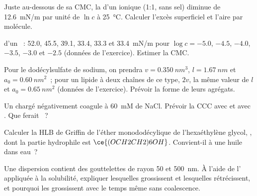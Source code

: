\begin{exercise}[$\star\star$]\label{exo:b3:colloids:5}
Juste au-dessous de sa CMC, la  d'un 
ionique (1:1, sans sel) diminue de \qty{12.6}{mN/m} par unité de $\ln c$
à \qty{25}{\celsius}. Calculer l'excès superficiel et
l'aire par molécule.
\end{exercise}

\begin{exercise}[$\star\star$]\label{exo:b3:colloids:6}
 d'un ~: 52.0, 45.5, 39.1,
33.4, 33.3 et
\qty{33.4}{mN/m} pour $\log c = -5.0$, $-4.5$, $-4.0$, $-3.5$, $-3.0$ et
$-2.5$ (données de l'exercice). Estimer la CMC.
\end{exercise}

\begin{exercise}[$\star\star$]\label{exo:b3:colloids:7}
Pour le dodécylsulfate de sodium, on prendra $v = \qty{0.350}{nm^3}$, $l = \qty{1.67}{nm}$ et $a_0 = \qty{0.60}{nm^2}$~;
pour un lipide à deux chaînes de ce type, $2v$, la même valeur de $l$ et
$a_0 = \qty{0.65}{nm^2}$ (données de l'exercice). Prévoir la forme de
leurs agrégats.
\end{exercise}

\begin{exercise}[$\star\star$]\label{exo:b3:colloids:8}
Un  chargé négativement coagule à \qty{60}{mM} de NaCl. Prévoir la
CCC avec 
et avec . Que ferait ~?
\end{exercise}

\begin{exercise}[$\star\star$]\label{exo:b3:colloids:9}
Calculer la HLB de Griffin de l'éther monododécylique de l'hexaéthylène
glycol,
, dont la partie hydrophile est $\ce{(OCH2CH2)6OH}$.
Convient-il à une  huile dans eau~?
\end{exercise}

\begin{exercise}[$\star\star\star$]\label{exo:b3:colloids:10}
Une dispersion contient des gouttelettes de rayon 50 et \qty{500}{nm}. À
l'aide de l' appliquée à la solubilité, expliquer
lesquelles grossissent et lesquelles rétrécissent, et pourquoi les
 grossissent avec le temps même sans coalescence.
\end{exercise}

